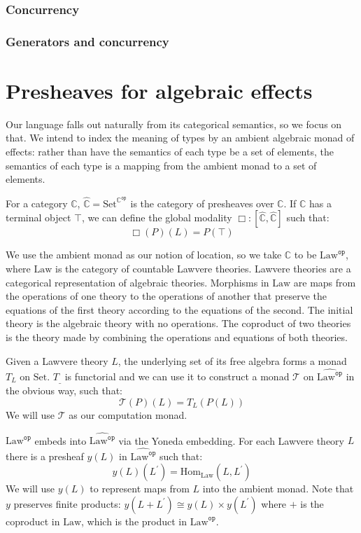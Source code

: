 \documentclass[acmsmall, screen, nonacm]{acmart}
\newcommand{\glob}{\mathop{\Box}}
\newcommand{\cat}{\mathbb{C}}
\newcommand{\catop}{\cat^{\mathtt{op}}}
\newcommand{\setc}{\mathrm{Set}}
\newcommand{\psh}{\widehat{\cat}}
\newcommand{\terminal}{\top}
\newcommand{\lawc}{\mathrm{Law}}
\newcommand{\lawcop}{\lawc^{\mathtt{op}}}
\newcommand{\pshlawcop}{\widehat{\lawcop}}
\newcommand{\yonedaname}{y}
\newcommand{\yoneda}[1]{y(#1)}
\newcommand{\homset}[3]{\mathrm{Hom}_{#1}(#2, #3)}
\newcommand{\mon}{\mathcal{T}}
\begin{document}
\subsubsection{Concurrency}

\subsubsection{Generators and concurrency}

\section{Presheaves for algebraic effects}
\label{sec:semantics}

Our language falls out naturally from its categorical semantics, so we
focus on that. We intend to index the meaning of types by an ambient
algebraic monad of effects: rather than have the semantics of each type
be a set of elements, the semantics of each type is a mapping from the
ambient monad to a set of elements.

For a category $\cat$, $\psh = \setc^{\catop}$ is the category of
presheaves over $\cat$. If $\cat$ has a terminal object $\terminal$, we
can define the global modality $\glob \mathrel{:} [\psh, \psh]$ such that:
\begin{equation*}
  \glob(P)(L) = P(\terminal)
\end{equation*}

We use the ambient monad as our notion of location, so we take $\cat$ to
be $\lawcop$, where $\lawc$ is the category of countable Lawvere
theories. Lawvere theories are a categorical representation of algebraic
theories. Morphisms in $\lawc$ are maps from the operations of one
theory to the operations of another that preserve the equations of the
first theory according to the equations of the second.  The initial
theory is the algebraic theory with no operations. The coproduct of two
theories is the theory made by combining the operations and equations of
both theories.

Given a Lawvere theory $L$, the underlying set of its free algebra forms
a monad $T_L$ on $\setc$. $T_{\_}$ is functorial and we can use it to
construct a monad $\mon$ on $\pshlawcop$ in the obvious way, such that:
\begin{equation*}
\mon(P)(L) = T_L(P(L))
\end{equation*}
We will use $\mon$ as our computation monad.

$\lawcop$ embeds into $\pshlawcop$ via the Yoneda embedding. For each
Lawvere theory $L$ there is a presheaf $\yoneda{L}$ in $\pshlawcop$ such
that:
\begin{equation*}
\yoneda{L}(L^{\prime}) = \homset{\lawc}{L}{L^{\prime}}
\end{equation*}
We will use $\yoneda{L}$ to represent maps from $L$ into the ambient
monad. Note that $\yonedaname$ preserves finite products:
$\yoneda{L + L^{\prime}} \cong \yoneda{L} \times \yoneda{L^{\prime}}$
where $+$ is the coproduct in $\lawc$, which is the product in
$\lawcop$.
\end{document}
